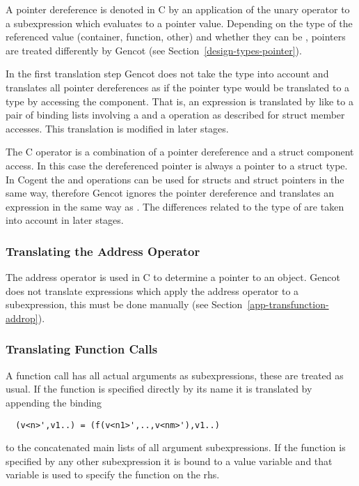 A pointer dereference is denoted in C by an application of the unary operator \code{*} to a subexpression which evaluates to
a pointer value. Depending on the type of the referenced value (container, function, other) and whether they can be , 
pointers are treated differently by Gencot (see Section~\ref{design-types-pointer}). 

In the first translation step Gencot does not take the type into account and translates all pointer dereferences as if the 
pointer type would be translated to a type  by accessing the  component. That is, an expression
 is translated by  like  to a pair of binding lists involving a  and a 
operation as described for struct member accesses. This translation is modified in later stages.

The C operator \code{->} is a combination of a pointer dereference and a struct component access. In this case the dereferenced 
pointer is always a pointer to a struct type. In Cogent the  and  operations can be used for structs and
struct pointers in the same way, therefore Gencot ignores the pointer dereference and translates an expression 
in the same way as . The differences related to the type of  are taken into account in later stages.

\subsubsection{Translating the Address Operator}

The address operator \code{\&} is used in C to determine a pointer to an object. Gencot does not translate expressions which
apply the address operator to a subexpression, this must be done manually (see Section~\ref{app-transfunction-addrop}).

\subsubsection{Translating Function Calls}

A function call has all actual arguments as subexpressions, these are treated as usual. If the function is specified directly 
by its name  it is translated by appending the binding
\begin{verbatim}
  (v<n>',v1..) = (f(v<n1>',..,v<nm>'),v1..)
\end{verbatim}
to the concatenated main lists of all argument subexpressions. If the function is specified by any other subexpression it is
bound to a value variable and that variable is used to specify the function on the rhs.

